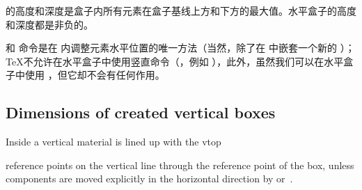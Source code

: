 \documentclass{book}
\begin{document}
 的高度和深度是盒子内所有元素在盒子基线上方和下方的最大值。水平盒子的高度和深度都是非负的。

 和  命令是在  内调整元素水平位置的唯一方法（当然，除了在  中嵌套一个新的 ）；\TeX 不允许在水平盒子中使用竖直命令（，例如 ），此外，虽然我们可以在水平盒子中使用 ，但它却不会有任何作用。

\subsection{Dimensions of created vertical boxes}

Inside a  vertical material is lined up with the
\cstoidx vtop\par
reference points on the vertical line through the reference
point of the box,
unless components are moved explicitly in the horizontal direction
by  or~.
\end{document}
